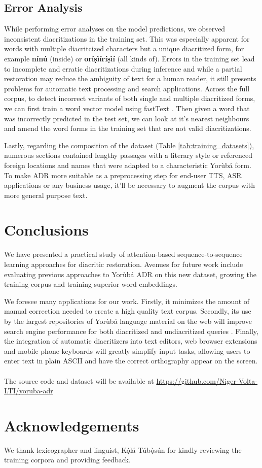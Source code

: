 \documentclass[a4paper]{article}
\begin{document}
\subsection{Error Analysis}
While performing error analyses on the model predictions, we observed inconsistent diacritizations in the training set. This was especially apparent for words with multiple diacritcized characters but a unique diacritized form, for example \textbf{n{\'i}n{\'u}} (inside) or \textbf{or{\'i}\d{s}{\`i}{\'i}r{\'i}\d{s}{\`i}{\'i}} (all kinds of). Errors in the training set lead to incomplete and erratic diacritizations during inference and while a partial restoration may reduce the ambiguity of text for a human reader, it still presents problems for automatic text processing and search applications. Across the full corpus, to detect incorrect variants of both single and multiple diacritized forms, we can first train a word vector model using fastText \cite{bojanowski2017enriching}. Then given a word that was incorrectly predicted in the test set, we can look at it's nearest neighbours and amend the word forms in the training set that are not valid diacritizations. 

Lastly, regarding the composition of the dataset (Table \ref{tab:training_datasets}), numerous sections contained lengthy passages with a literary style or referenced foreign locations and names that were adapted to a characteristic Yor{\`u}b{\'a} form. To make ADR more suitable as a preprocessing step for end-user TTS, ASR applications or any business usage, it'll be necessary to augment the corpus with more general purpose text.

\section{Conclusions}

We have presented a practical study of attention-based sequence-to-sequence learning approaches for diacritic restoration. Avenues for future work include evaluating previous approaches to Yor{\`u}b{\'a} ADR on this new dataset, growing the training corpus and training superior word embeddings.

We foresee many applications for our work. Firstly, it minimizes the amount of manual correction needed to create a high quality text corpus. Secondly, its use by the largest repositories of Yor{\`u}b{\'a} language material on the web will improve search engine performance for both diacritized and undiacritized queries \cite{asubiaro2014effects}. Finally, the integration of automatic diacritizers into text editors, web browser extensions and mobile phone keyboards will greatly simplify input tasks, allowing users to enter text in plain ASCII and have the correct orthography appear on the screen.
\\
\\
The source code and dataset will be available at \url{https://github.com/Niger-Volta-LTI/yoruba-adr}

\section{Acknowledgements}

We thank lexicographer and linguist, K\d{\'{o}}l\'{a} T\'{u}b\d{\`{o}}s\'{u}n for kindly reviewing the training corpora and providing feedback.




\end{document}
